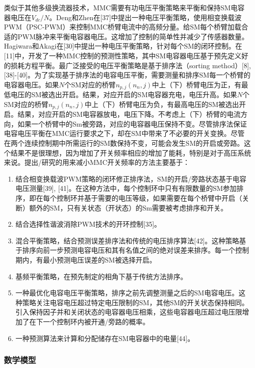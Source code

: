   类似于其他多级换流器技术，MMC需要有功电压平衡策略来平衡和保持SM电容器电压在$V_{dc}/N$。Deng和Zhen在[37]中提出一种电压平衡策略，使用相变换载波PWM（PSC-PWM）来控制MMC桥臂电流中的高频分量。给SM每个桥臂加载合适的PWM脉冲来平衡电容器电压。这增加了控制的简单性并减少了传感器数量。Hagiwara和Akagi在[30]中提出一种电压平衡策略，针对每个SM的闭环控制。在[11]中，开发了一种MMC控制的预测性策略，其中SM电容器电压基于预先定义好的损耗方程平衡。最广泛接受的电压平衡策略是基于排序法（sorting method）[8], [38]-[40]。为了实现基于排序法的电容电压平衡，需要测量和排序SM每一个桥臂的电容器电压。如果$N$个SM对应的桥臂$n_{p,j}(n_n,j)$中上（下）桥臂电压为正，有最低电压的SM被选出开启。结果，对应开启的SM电容器充电，电压升高。如果$N$个SM对应的桥臂$n_{p,j}(n_n,j)$中上（下）桥臂电压为负，有最高电压的SM被选出开启。结果，对应开启的SM电容器放电，电压下降。不考虑上（下）桥臂的电流方向，如果一个桥臂中的Sm被旁路，对应的电容器电压保持不变。尽管排序法保证电容电压平衡在MMC运行要求之下，却在SM中带来了不必要的开关变换。尽管在两个连续控制期中所需运行的SM数保持不变，可能会发生SM的开启或旁路。这个结果不是很理想，因为增加了开关频率相应的增加了能耗，特别是对于高压系统来说。提出/研究的用来减小MMC开关频率的方法主要基于：
  \begin{enumerate}[1)]
  \item 结合相变换载波PWM策略的闭环修正排序法，SM的开启/旁路状态基于电容电压测量[39], [41]。在这种方法中，每个控制环中只有有限数量的SM参加排序，即在每个控制环并基于需要的电压等级，如果需要在每个桥臂中开启（关断）额外的SM，只有关状态（开状态）的Sm需要被考虑排序和开关。
  \item 结合选择性谐波消除PWM技术的开环控制[35]。
  \item 混合平衡策略，结合预测误差排序法和传统的电压排序算法[42]。这种策略基于排序向前一步预测电容电压和其有名值之间的绝对误差来排序。每一个控制期内，有最小预测电压误差的SM被选择开启。
  \item 基频平衡策略，在预先制定的相角下基于传统方法排序。
  \item 一种最优化电容电压平衡策略，排序之前先调整测量之后的SM电容电压。这种策略关注电容电压超过特定电压限制的SM，其他SM的开关状态保持相同。引入保持因子并和关闭状态的电容器电压相乘，这些电容器电压超过电压限增加了在下一个控制环内被开通/旁路的概率。
  \item 一种预测算法来计算和分配储存在SM电容器中的电量[44]。
  \end{enumerate}
  
  \subsubsection{数学模型}
  

